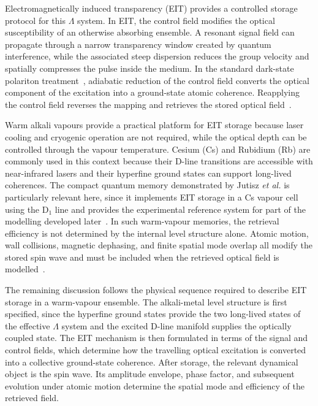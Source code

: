 Electromagnetically induced transparency (EIT) provides a controlled storage protocol for this $\Lambda$ system. In EIT, the control field modifies the optical susceptibility of an otherwise absorbing ensemble. A resonant signal field can propagate through a narrow transparency window created by quantum interference, while the associated steep dispersion reduces the group velocity and spatially compresses the pulse inside the medium. In the standard dark-state polariton treatment~\cite{C:Tampsiae_Lukin_2003}, adiabatic reduction of the control field converts the optical component of the excitation into a ground-state atomic coherence. Reapplying the control field reverses the mapping and retrieves the stored optical field~\cite{Oqmboeit_MaEtAl_2017,Apgteitiav_FinkelsteinEtAl_2023,C:Tampsiae_Lukin_2003}.

Warm alkali vapours provide a practical platform for EIT storage because laser cooling and cryogenic operation are not required, while the optical depth can be controlled through the vapour temperature. Cesium (Cs) and Rubidium (Rb) are commonly used in this context because their D-line transitions are accessible with near-infrared lasers and their hyperfine ground states can support long-lived coherences. The compact quantum memory demonstrated by Jutisz \emph{et al.} is particularly relevant here, since it implements EIT storage in a Cs vapour cell using the D$_1$ line and provides the experimental reference system for part of the modelling developed later~\cite{Smqms_JutiszEtAl_2025}. In such warm-vapour memories, the retrieval efficiency is not determined by the internal level structure alone. Atomic motion, wall collisions, magnetic dephasing, and finite spatial mode overlap all modify the stored spin wave and must be included when the retrieved optical field is modelled~\cite{Smqms_JutiszEtAl_2025,Apgteitiav_FinkelsteinEtAl_2023}.

The remaining discussion follows the physical sequence required to describe EIT storage in a warm-vapour ensemble. The alkali-metal level structure is first specified, since the hyperfine ground states provide the two long-lived states of the effective $\Lambda$ system and the excited D-line manifold supplies the optically coupled state. The EIT mechanism is then formulated in terms of the signal and control fields, which determine how the travelling optical excitation is converted into a collective ground-state coherence. After storage, the relevant dynamical object is the spin wave. Its amplitude envelope, phase factor, and subsequent evolution under atomic motion determine the spatial mode and efficiency of the retrieved field.

